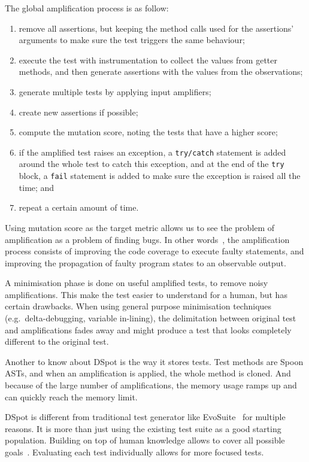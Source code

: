 \documentclass[a4paper,11pt]{sdm_internship}
\newcommand{\dspot}{DSpot\xspace}
\theoremstyle{definition}
\begin{document}
The global amplification process is as follow:
\begin{enumerate}
  \item remove all assertions, but keeping the method calls used for the assertions' arguments to make sure the test triggers the same behaviour;
  \item execute the test with instrumentation to collect the values from getter methods, and then generate assertions with the values from the observations;
  \item generate multiple tests by applying input amplifiers;
  \item create new assertions if possible;
  \item compute the mutation score, noting the tests that have a higher score;
  \item if the amplified test raises an exception, a \texttt{try/catch} statement is added around the whole test to catch this exception, and at the end of the \texttt{try} block, a \texttt{fail} statement is added to make sure the exception is raised all the time; and
  \item repeat a certain amount of time.
\end{enumerate}

Using mutation score as the target metric allows us to see the problem of amplification as a problem of finding bugs.
In other words~\cite{shamshiri2015automatically}, the amplification process consists of improving the code coverage to execute faulty statements, and improving the propagation of faulty program states to an observable output.

A minimisation phase is done on useful amplified tests, to remove noisy amplifications.
This make the test easier to understand for a human, but has certain drawbacks.
When using general purpose minimisation techniques (e.g.\ delta-debugging, variable in-lining), the delimitation between original test and amplifications fades away and might produce a test that looks completely different to the original test.

Another to know about \dspot{} is the way it stores tests.
Test methods are Spoon ASTs, and when an amplification is applied, the whole method is cloned.
And because of the large number of amplifications, the memory usage ramps up and can quickly reach the memory limit.

\dspot{} is different from traditional test generator like EvoSuite~\cite{fraser2011evosuite} for multiple reasons.
It is more than just using the existing test suite as a good starting population.
Building on top of human knowledge allows to cover all possible goals~\cite{rojas2017detailed}.
Evaluating each test individually allows for more focused tests.
\end{document}
